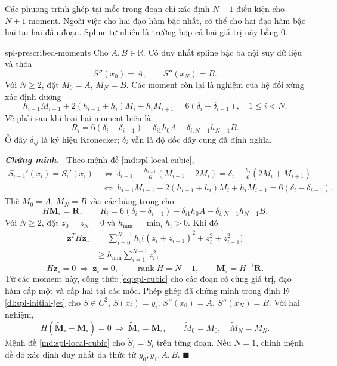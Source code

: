 \documentclass[12pt,a4paper,oneside]{book}
\numberwithin{algorithm}{chapter}
\theoremstyle{definition}
\newenvironment{chungminh}{\par\medskip\noindent\textbf{\textit{\color{mainblue}Chứng minh.}}\ }{\hfill$\blacksquare$\par\medskip}
\newcommand{\R}{\mathbb{R}}
\begin{document}
Các phương trình ghép tại mốc trong đoạn chỉ xác định $N-1$ điều kiện cho $N+1$ moment. Ngoài việc cho hai đạo hàm bậc nhất, có thể cho hai đạo hàm bậc hai tại hai đầu đoạn. Spline tự nhiên là trường hợp cả hai giá trị này bằng $0$.
\begin{dinhly}{}{spl-prescribed-moments}
Cho $A,B\in\R$. Có duy nhất spline bậc ba nội suy dữ liệu và thỏa
\[
 S''(x_0)=A,\qquad S''(x_N)=B.
\]
Với $N\geq2$, đặt $M_0=A$, $M_N=B$. Các moment còn lại là nghiệm của hệ đối xứng xác định dương
\begin{equation}\label{eq:spl-prescribed-moment-system}
 h_{i-1}M_{i-1}+2(h_{i-1}+h_i)M_i+h_iM_{i+1}
 =6(\delta_i-\delta_{i-1}),\quad1\leq i<N.
\end{equation}
Vế phải sau khi loại hai moment biên là
\[
 R_i=6(\delta_i-\delta_{i-1})
 -\delta_{i1}h_0A-\delta_{i,N-1}h_{N-1}B.
\]
Ở đây $\delta_{ij}$ là ký hiệu Kronecker; $\delta_i$ vẫn là độ dốc dây cung đã định nghĩa.
\end{dinhly}
\begin{chungminh}
Theo mệnh đề \ref{md:spl-local-cubic},
\begin{align*}
 S_{i-1}'(x_i)=S_i'(x_i)
 &\ \Longleftrightarrow\
 \delta_{i-1}+\frac{h_{i-1}}6(M_{i-1}+2M_i)
 =\delta_i-\frac{h_i}6(2M_i+M_{i+1})\\
 &\ \Longleftrightarrow\
 h_{i-1}M_{i-1}+2(h_{i-1}+h_i)M_i+h_iM_{i+1}
 =6(\delta_i-\delta_{i-1}).
\end{align*}
Thế $M_0=A$, $M_N=B$ vào các hàng trong cho
\[
 H\mathbf M_\circ=\mathbf R,\qquad
 R_i=6(\delta_i-\delta_{i-1})
 -\delta_{i1}h_0A-\delta_{i,N-1}h_{N-1}B.
\]
Với $N\geq2$, đặt $z_0=z_N=0$ và $h_{\min}=\min_i h_i>0$. Khi đó
\begin{align*}
 \mathbf z_\circ^TH\mathbf z_\circ
 &=\sum_{i=0}^{N-1}h_i\bigl((z_i+z_{i+1})^2+z_i^2+z_{i+1}^2\bigr)\\
 &\geq h_{\min}\sum_{i=1}^{N-1}z_i^2,
\end{align*}
\[
 H\mathbf z_\circ=0\ \Longrightarrow\ \mathbf z_\circ=0,
 \qquad \operatorname{rank}H=N-1,\qquad
 \mathbf M_\circ=H^{-1}\mathbf R.
\]
Từ các moment này, công thức \eqref{eq:spl-cubic} cho các đoạn có cùng giá trị, đạo hàm cấp một và cấp hai tại các mốc. Phép ghép đã chứng minh trong định lý \ref{dl:spl-initial-jet} cho $S\in C^2$, $S(x_i)=y_i$, $S''(x_0)=A$, $S''(x_N)=B$. Với hai nghiệm,
\[
 H(\widetilde{\mathbf M}_\circ-\mathbf M_\circ)=0
 \ \Longrightarrow\ \widetilde{\mathbf M}_\circ=\mathbf M_\circ,
 \qquad \widetilde M_0=M_0,\quad\widetilde M_N=M_N.
\]
Mệnh đề \ref{md:spl-local-cubic} cho $\widetilde S_i=S_i$ trên từng đoạn. Nếu $N=1$, chính mệnh đề đó xác định duy nhất đa thức từ $y_0,y_1,A,B$.
\end{chungminh}
\end{document}
